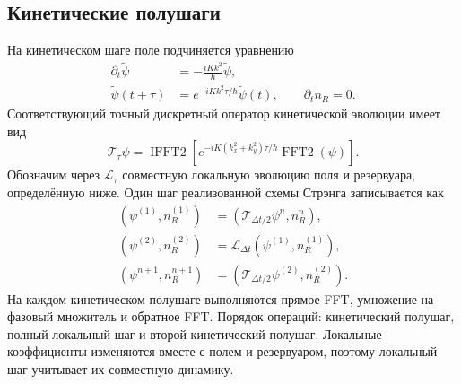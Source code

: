 \documentclass[12pt,a4paper]{article}
\begin{document}
\subsection{Кинетические полушаги}\label{sec:B.2}
На кинетическом шаге поле подчиняется уравнению
\begin{equation}
\begin{aligned}
\partial_t\widetilde\psi&=-\frac{iKk^2}{\hbar}\widetilde\psi,\\
\widetilde\psi(t+\tau)&=e^{-iKk^2\tau/\hbar}\widetilde\psi(t),
\qquad \partial_t n_R=0.
\end{aligned}\label{eq:B.kinetic}
\end{equation}
Соответствующий точный дискретный оператор кинетической эволюции имеет вид
\begin{equation}
\mathcal T_\tau\psi=
\operatorname{IFFT2}\!\left[
e^{-iK(k_x^2+k_y^2)\tau/\hbar}
\operatorname{FFT2}(\psi)\right].\label{eq:B.kinetic-map}
\end{equation}
Обозначим через \(\mathcal L_\tau\) совместную локальную эволюцию поля и резервуара, определённую ниже. Один шаг реализованной схемы Стрэнга записывается как
\begin{equation}
\begin{aligned}
(\psi^{(1)},n_R^{(1)})&=(\mathcal T_{\Delta t/2}\psi^n,n_R^n),\\
(\psi^{(2)},n_R^{(2)})&=\mathcal L_{\Delta t}
(\psi^{(1)},n_R^{(1)}),\\
(\psi^{n+1},n_R^{n+1})&=(\mathcal T_{\Delta t/2}\psi^{(2)},n_R^{(2)}).
\end{aligned}\label{eq:B.strang}
\end{equation}
На каждом кинетическом полушаге выполняются прямое FFT, умножение на фазовый множитель и обратное FFT. Порядок операций: кинетический полушаг, полный локальный шаг и второй кинетический полушаг. Локальные коэффициенты изменяются вместе с полем и резервуаром, поэтому локальный шаг учитывает их совместную динамику.
\end{document}
